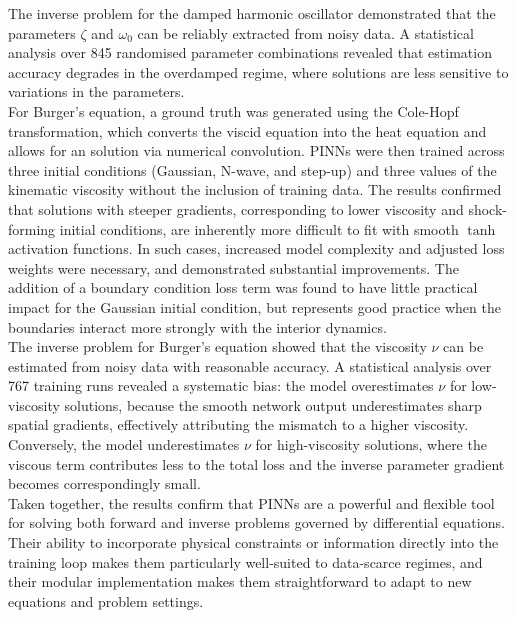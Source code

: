 \documentclass[we,twoside,openright,a4paper,11pt]{uantwerpenbamathesis}
\begin{document}
The inverse problem for the damped harmonic oscillator demonstrated that the parameters $\zeta$ and $\omega_0$ can be reliably extracted from noisy data. A statistical analysis over 845 randomised parameter combinations revealed that estimation accuracy degrades in the overdamped regime, where solutions are less sensitive to variations in the parameters.\\

For Burger's equation, a ground truth was generated using the Cole-Hopf transformation, which converts the viscid equation into the heat equation and allows for an solution via numerical convolution. PINNs were then trained across three initial conditions (Gaussian, N-wave, and step-up) and three values of the kinematic viscosity without the inclusion of training data. The results confirmed that solutions with steeper gradients, corresponding to lower viscosity and shock-forming initial conditions, are inherently more difficult to fit with smooth $\tanh$ activation functions. In such cases, increased model complexity and adjusted loss weights were necessary, and demonstrated substantial improvements. The addition of a boundary condition loss term was found to have little practical impact for the Gaussian initial condition, but represents good practice when the boundaries interact more strongly with the interior dynamics.\\

The inverse problem for Burger's equation showed that the viscosity $\nu$ can be estimated from noisy data with reasonable accuracy. A statistical analysis over 767 training runs revealed a systematic bias: the model overestimates $\nu$ for low-viscosity solutions, because the smooth network output underestimates sharp spatial gradients, effectively attributing the mismatch to a higher viscosity. Conversely, the model underestimates $\nu$ for high-viscosity solutions, where the viscous term contributes less to the total loss and the inverse parameter gradient becomes correspondingly small.\\

Taken together, the results confirm that PINNs are a powerful and flexible tool for solving both forward and inverse problems governed by differential equations. Their ability to incorporate physical constraints or information directly into the training loop makes them particularly well-suited to data-scarce regimes, and their modular implementation makes them straightforward to adapt to new equations and problem settings.





\end{document}
